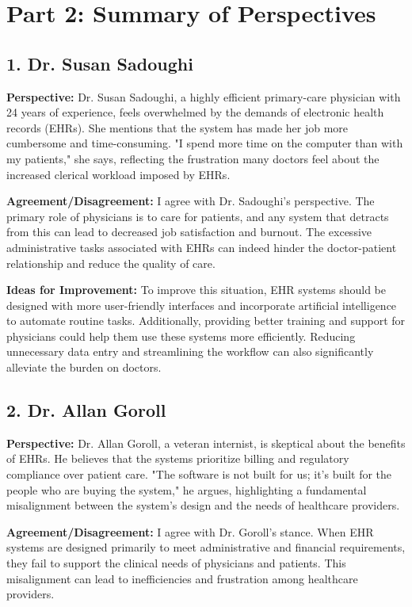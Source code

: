 \documentclass{article}
\begin{document}
\section*{Part 2: Summary of Perspectives}

\subsection*{1. Dr. Susan Sadoughi}

\textbf{Perspective:} Dr. Susan Sadoughi, a highly efficient primary-care physician with 24 years of experience, feels overwhelmed by the demands of electronic health records (EHRs). She mentions that the system has made her job more cumbersome and time-consuming. "I spend more time on the computer than with my patients," she says, reflecting the frustration many doctors feel about the increased clerical workload imposed by EHRs.

\textbf{Agreement/Disagreement:} I agree with Dr. Sadoughi's perspective. The primary role of physicians is to care for patients, and any system that detracts from this can lead to decreased job satisfaction and burnout. The excessive administrative tasks associated with EHRs can indeed hinder the doctor-patient relationship and reduce the quality of care.

\textbf{Ideas for Improvement:} To improve this situation, EHR systems should be designed with more user-friendly interfaces and incorporate artificial intelligence to automate routine tasks. Additionally, providing better training and support for physicians could help them use these systems more efficiently. Reducing unnecessary data entry and streamlining the workflow can also significantly alleviate the burden on doctors.

\subsection*{2. Dr. Allan Goroll}

\textbf{Perspective:} Dr. Allan Goroll, a veteran internist, is skeptical about the benefits of EHRs. He believes that the systems prioritize billing and regulatory compliance over patient care. "The software is not built for us; it's built for the people who are buying the system," he argues, highlighting a fundamental misalignment between the system's design and the needs of healthcare providers.

\textbf{Agreement/Disagreement:} I agree with Dr. Goroll's stance. When EHR systems are designed primarily to meet administrative and financial requirements, they fail to support the clinical needs of physicians and patients. This misalignment can lead to inefficiencies and frustration among healthcare providers.
\end{document}
